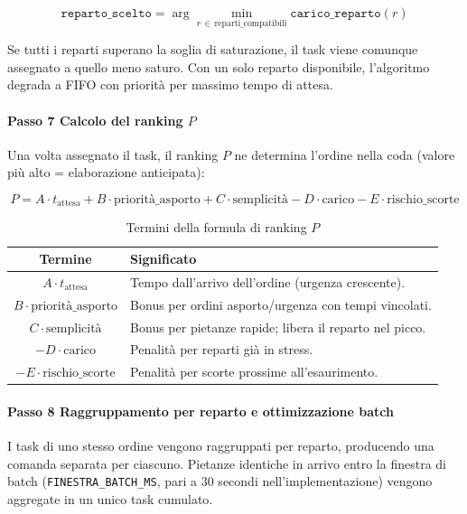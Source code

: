 \begin{equation}
\label{eq:routing}
\mathtt{reparto\_scelto} = \arg\min_{r \,\in\, \text{reparti\_compatibili}} \mathtt{carico\_reparto}(r)
\end{equation}

Se tutti i reparti superano la soglia di saturazione, il task viene comunque
assegnato a quello meno saturo. Con un solo reparto disponibile, l'algoritmo degrada
a FIFO con priorità per massimo tempo di attesa.

\paragraph{Passo 7  Calcolo del ranking \texorpdfstring{$P$}{P}}
Una volta assegnato il task, il ranking $P$ ne determina l'ordine nella coda (valore
più alto = elaborazione anticipata):

\begin{equation}
\label{eq:ranking}
P = A \cdot t_{\text{attesa}} + B \cdot \text{priorità\_asporto} + C \cdot \text{semplicità} - D \cdot \text{carico} - E \cdot \text{rischio\_scorte}
\end{equation}

\begin{table}[H]
\centering
\caption{Termini della formula di ranking $P$}
\label{tab:ranking}
\begin{tabular}{cl}
\toprule
\textbf{Termine} & \textbf{Significato} \\
\midrule
$A \cdot t_{\text{attesa}}$             & Tempo dall'arrivo dell'ordine (urgenza crescente). \\
$B \cdot \text{priorità\_asporto}$      & Bonus per ordini asporto/urgenza con tempi vincolati. \\
$C \cdot \text{semplicità}$             & Bonus per pietanze rapide; libera il reparto nel picco. \\
$-D \cdot \text{carico}$                & Penalità per reparti già in stress. \\
$-E \cdot \text{rischio\_scorte}$       & Penalità per scorte prossime all'esaurimento. \\
\bottomrule
\end{tabular}
\end{table}

\paragraph{Passo 8  Raggruppamento per reparto e ottimizzazione batch}
I task di uno stesso ordine vengono raggruppati per reparto, producendo una comanda
separata per ciascuno. Pietanze identiche in arrivo entro la finestra di batch
(\texttt{FINESTRA\_BATCH\_MS}, pari a $30$ secondi nell'implementazione) vengono
aggregate in un unico task cumulato.

